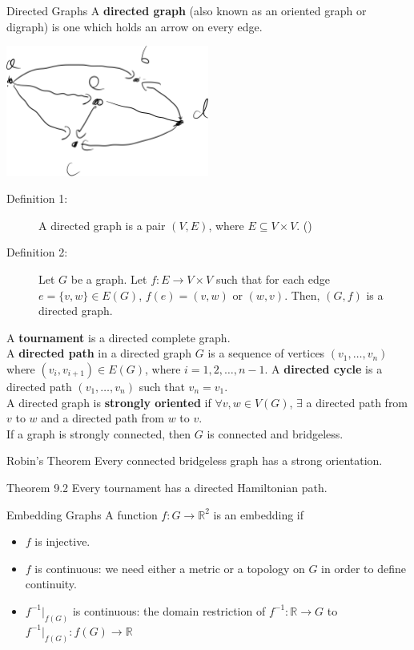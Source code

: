 \documentclass[10pt]{extarticle}
\begin{document}
  \begin{problem}{Directed Graphs}
    A \textbf{directed graph} (also known as an oriented graph or digraph) is one which holds an arrow on every edge.
    \begin{center}
      \includegraphics[width=0.5\textwidth]{images/digraph.png}
    \end{center}
    \begin{description}
      \item[Definition 1:] A directed graph is a pair $(V,E)$, where $E\subseteq V\times V$. (\textasteriskcentered)
      \item[Definition 2:] Let $G$ be a graph. Let $f: E \rightarrow V\times V$ such that for each edge $e = \{v,w\}\in E(G)$, $f(e) = (v,w)$ or $(w,v)$. Then, $(G,f)$ is a directed graph.
    \end{description}
    A \textbf{tournament} is a directed complete graph.\\

    A \textbf{directed path} in a directed graph $G$ is a sequence of vertices $(v_1,\dots,v_n)$ where $(v_i,v_{i+1})\in E(G)$, where $i = 1,2,\dots,n-1$. A \textbf{directed cycle} is a directed path $(v_1,\dots,v_n)$ such that $v_n = v_1$.\\

    A directed graph is \textbf{strongly oriented} if $\forall v,w\in V(G)$, $\exists$ a directed path from $v$ to $w$ and a directed path from $w$ to $v$.\\

    If a graph is strongly connected, then $G$ is connected and bridgeless. 
  \end{problem}
  \begin{problem}{Robin's Theorem}
    Every connected bridgeless graph has a strong orientation.
  \end{problem}
  \begin{problem}{Theorem 9.2}
    Every tournament has a directed Hamiltonian path.
  \end{problem}
  \begin{problem}{Embedding Graphs}
    A function $f: G \rightarrow \mathbb{R}^2$ is an embedding if
    \begin{itemize}
      \item $f$ is injective.
      \item $f$ is continuous: we need either a metric or a topology on $G$ in order to define continuity.
      \item $f^{-1}\bigr\vert_{f(G)}$ is continuous: the domain restriction of $f^{-1}: \mathbb{R} \rightarrow G$ to $f^{-1}\bigr\vert_{f(G)}: f(G) \rightarrow \mathbb{R}$
    \end{itemize}
  \end{problem}
\end{document}

